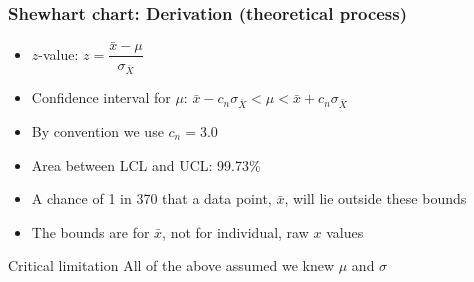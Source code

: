 \begin{frame}\frametitle{Shewhart chart: Derivation (theoretical process)}
	\begin{itemize}
		\item	$z$-value: $z = \dfrac{\bar{x} - \mu}{\sigma_{\bar{X}}}$
	\end{itemize}
	\begin{itemize}
		\item	Confidence interval for $\mu$: $\bar{x} - c_n\sigma_{\bar{X}} < \mu < \bar{x} + c_n\sigma_{\bar{X}}$
	\end{itemize}
	\begin{itemize}
		\item	By convention we use $c_n = 3.0$
		\item	Area between LCL and UCL: 99.73\%
		\item	A chance of 1 in 370 that a data point, $\bar{x}$, will lie outside these bounds
		\item	The bounds are for $\bar{x}$, not for individual, raw $x$ values
	\end{itemize}
	\begin{exampleblock}{Critical limitation}
		All of the above assumed we knew $\mu$ and $\sigma$
	\end{exampleblock}
\end{frame}

